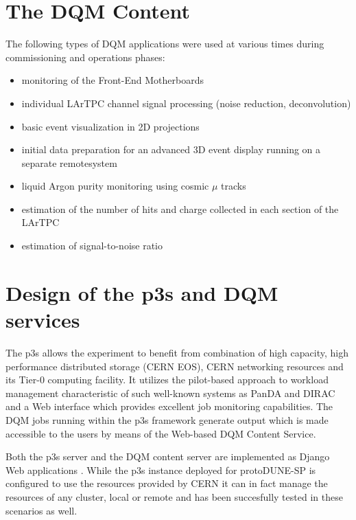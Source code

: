 \documentclass[pdftex,12pt,letter]{article}
\newcommand{\pd}{protoDUNE\xspace}
\begin{document}
\section{The DQM Content}
The following types of DQM applications were used at various times during
commissioning and operations phases:
\begin{itemize}
\item monitoring of the Front-End Motherboards
\item individual LArTPC channel signal processing (noise reduction, deconvolution)
\item basic event visualization in 2D projections
\item initial data preparation for an advanced 3D event display running on a separate remotesystem
\item liquid Argon purity monitoring using cosmic $\mu$ tracks
\item estimation of the number of hits and charge collected in each section of the LArTPC
\item estimation of signal-to-noise ratio
\end{itemize}



\section{Design of the p3s and DQM services}


The  p3s  allows the experiment to benefit from combination
of high capacity, high performance distributed storage (CERN EOS), CERN networking
resources and its Tier-0 computing facility. It utilizes  the pilot-based approach \cite{eps}
to workload management characteristic of such well-known systems as PanDA and
DIRAC \cite{panda,dirac} and a Web interface which provides excellent job monitoring capabilities.
The DQM jobs running within the p3s framework generate output which is made
accessible to the users by means of the Web-based DQM Content Service.

Both the p3s server and the DQM content server are implemented as Django
Web applications \cite{django}. While the p3s instance deployed for \pd-SP is configured to use
the resources provided by CERN it can in fact manage the resources of any cluster,
local or remote and has been succesfully tested in these scenarios as well.
\end{document}
